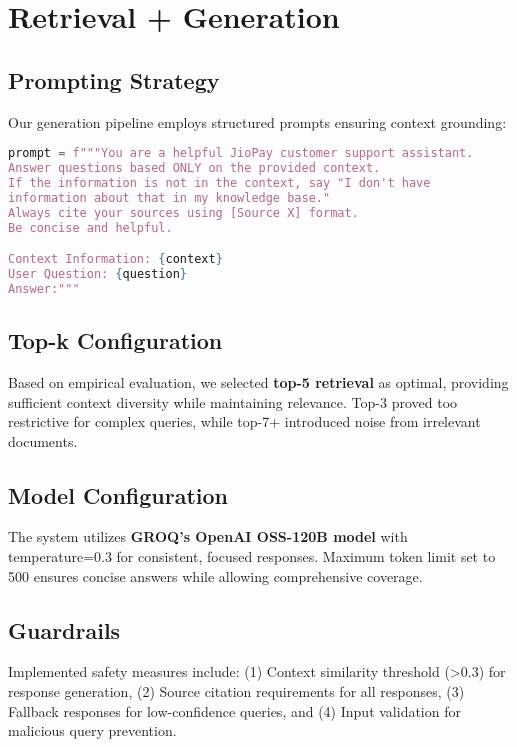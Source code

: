 \documentclass[11pt,a4paper]{article}
\begin{document}
\section{Retrieval + Generation}

\subsection{Prompting Strategy}

Our generation pipeline employs structured prompts ensuring context grounding:

\begin{lstlisting}[language=Python, basicstyle=\footnotesize]
prompt = f"""You are a helpful JioPay customer support assistant. 
Answer questions based ONLY on the provided context. 
If the information is not in the context, say "I don't have 
information about that in my knowledge base."
Always cite your sources using [Source X] format.
Be concise and helpful.

Context Information: {context}
User Question: {question}
Answer:"""
\end{lstlisting}

\subsection{Top-k Configuration}

Based on empirical evaluation, we selected \textbf{top-5 retrieval} as optimal, providing sufficient context diversity while maintaining relevance. Top-3 proved too restrictive for complex queries, while top-7+ introduced noise from irrelevant documents.

\subsection{Model Configuration}

The system utilizes \textbf{GROQ's OpenAI OSS-120B model} with temperature=0.3 for consistent, focused responses. Maximum token limit set to 500 ensures concise answers while allowing comprehensive coverage.

\subsection{Guardrails}

Implemented safety measures include: (1) Context similarity threshold (>0.3) for response generation, (2) Source citation requirements for all responses, (3) Fallback responses for low-confidence queries, and (4) Input validation for malicious query prevention.
\end{document}
